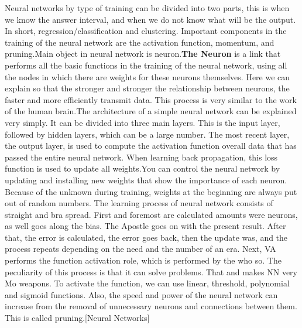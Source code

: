 Neural networks by type of training can be divided into two parts, this is when we know the answer interval, and when we do not know what will be the output. In short, regression/classification and clustering. Important components in the training of the neural network are the activation function, momentum, and pruning.Main object in neural network is neuron.\textbf{The Neuron} is a link that performs all the basic functions in the training of the neural network, using all the nodes in which there are weights for these neurons themselves. Here we can explain so that the stronger and stronger the relationship between neurons, the faster and more efficiently transmit data. This process is very similar to the work of the human brain.The architecture of a simple neural network can be explained very simply. It can be divided into three main layers. This is the input layer, followed by hidden layers, which can be a large number. The most recent layer, the output layer, is used to compute the activation function overall data that has passed the entire neural network. When learning back propagation, this loss function is used to update all weights.You can control the neural network by updating and installing new weights that show the importance of each neuron. Because of the unknown during training, weights at the beginning are always put out of random numbers. The learning process of neural network consists of straight and bra spread. First and foremost are calculated amounts were neurons, as well goes along the bias. The Apostle goes on with the present result. After that, the error is calculated, the error goes back, then the update was, and the process repeats depending on the need and the number of an era. Next, VA performs the function activation role, which is performed by the who so. The peculiarity of this process is that it can solve problems. That and makes NN very Mo weapons. To activate the function, we can use linear, threshold, polynomial and sigmoid functions. Also, the speed and power of the neural network can increase from the removal of unnecessary neurons and connections between them. This is called pruning.[Neural Networks]

